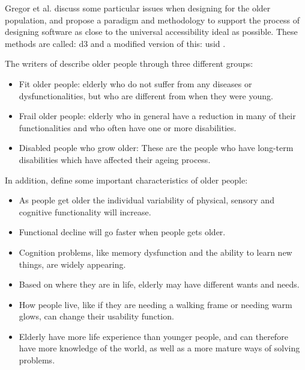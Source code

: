 Gregor et al. \cite{gregor} discuss some particular issues when designing for the older population, and propose a paradigm and methodology to support the process of designing software as close to the universal accessibility ideal as possible. These methods are called: \ac{d3} and a modified version of this: \ac{usid} \cite{gregor}.

The writers of \cite{gregor} describe older people through three different groups:
\begin{itemize}
\item Fit older people: elderly who do not suffer from any diseases or dysfunctionalities, but who are different from when they were young.
\item Frail older people: elderly who in  general have a reduction in many of their functionalities and who often have one or more disabilities.
\item Disabled people who grow older: These are the people who have long-term disabilities which have affected their ageing process.
\end{itemize}

In addition, \cite{gregor} define some important characteristics of older people:
\begin{itemize}
\item As people get older the individual variability of physical, sensory and cognitive functionality will increase. 
\item Functional decline will go faster when people gets older. 
\item Cognition problems, like memory dysfunction and the ability to learn new things, are widely appearing.
\item Based on where they are in life, elderly may have different wants and needs. 
\item How people live, like if they are needing a walking frame or needing warm glows, can change their usability function.
\item Elderly have more life experience than younger people, and can therefore have more knowledge of the world, as well as a more mature ways of solving problems. 
\end{itemize}

